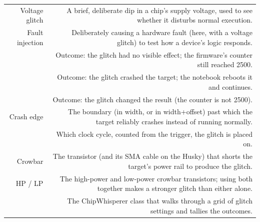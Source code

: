 \documentclass[11pt,letterpaper]{article}
\begin{document}
\vspace{4pt}


{\small{}
\begin{longtable}{|R{0.2174}|R{0.7826}|}
\hline
{} &  \\ \hline
\endhead
Voltage glitch & A brief, deliberate dip in a chip's supply voltage, used to see whether it disturbs normal execution. \\ \hline
Fault injection & Deliberately causing a hardware fault (here, with a voltage glitch) to test how a device's logic responds. \\ \hline
{} & Outcome: the glitch had no visible effect; the firmware's counter still reached 2500. \\ \hline
{} & Outcome: the glitch crashed the target; the notebook reboots it and continues. \\ \hline
{} & Outcome: the glitch changed the result (the counter is not 2500). \\ \hline
Crash edge & The boundary (in width, or in width+offset) past which the target reliably crashes instead of running normally. \\ \hline
{} & Which clock cycle, counted from the trigger, the glitch is placed on. \\ \hline
Crowbar & The transistor (and its SMA cable on the Husky) that shorts the target's power rail to produce the glitch. \\ \hline
HP / LP & The high-power and low-power crowbar transistors; using both together makes a stronger glitch than either alone. \\ \hline
{} & The ChipWhisperer class that walks through a grid of glitch settings and tallies the outcomes. \\ \hline
\end{longtable}}

\vspace{4pt}


\end{document}
